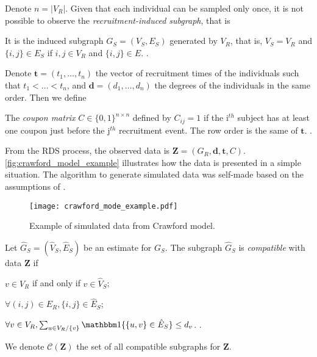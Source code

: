 Denote $n = |V_R|$. Given that each individual can be sampled only once, it is not possible to
observe the {\em recruitment-induced subgraph}, that is

\begin{definition}
  It is the induced subgraph $G_S = (V_S, E_S)$ generated by $V_R$, that is,
  $V_S = V_R$ and $\{i,j\} \in E_S$ if $i, j \in V_R$ and $\{i, j\} \in E$. 
  \cite[p. 192]{crawford2016}.
\end{definition}

Denote $\boldsymbol{t} = (t_1, \dots, t_n)$ the vector of recruitment times of
the individuals such that $t_1 < \dots < t_n$, and $\boldsymbol{d} = (d_1,
\dots, d_n)$ the degrees of the individuals in the same order. Then we define 

\begin{definition}
  The {\em coupon matrix} $C \in \{0,1\}^{n\times n}$ defined by $C_{ij} =
1$ if the i$^{th}$ subject has at least one coupon just before the j$^{th}$
recruitment event. The row order is the same of $\boldsymbol{t}$. \cite[p.
193]{crawford2016}. 
\end{definition}

From the RDS process, the observed data is $\boldsymbol{Z} = (G_R,
\boldsymbol{d}, \boldsymbol{t}, C)$. \autoref{fig:crawford_model_example}
illustrates how the data is presented in a simple situation. The algorithm to
generate simulated data was self-made based on the assumptions of
\textcite{crawford2016}.

\begin{figure}
  \centering
  \caption{\label{fig:crawford_model_example}Example of simulated data from
  Crawford model.}
  \texttt{[image: crawford\_mode\_example.pdf]}
\end{figure}

\begin{definition}[Compatibility]
  Let $\hat{G}_S = (\hat{V}_S, \hat{E}_S)$ be an estimate for $G_S$. The 
  subgraph $\hat{G}_S$ is {\em compatible} with data $\boldsymbol{Z}$ if 
  \begin{alineas}
    \item $v \in V_R$ if and only if $v \in \hat{V}_S$;
    \item $\forall (i,j) \in E_R, \{i,j\} \in \hat{E}_S$;
    \item $\forall v \in V_R, \sum_{u \in V_R / \{v\}} \ind\{\{u,v\} \in
    \hat{E}_S\} \le d_v$. \cite[p. 197]{crawford2016}.
  \end{alineas}
  We denote $\mathcal{C}(\boldsymbol{Z})$ the set of all compatible subgraphs
  for $\boldsymbol{Z}$. 
\end{definition}

